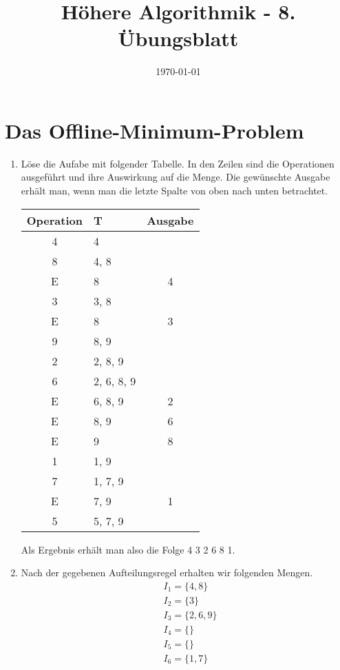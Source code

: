 \documentclass[a4paper,10pt]{article}
\title{H\"ohere Algorithmik - 8. \"Ubungsblatt}
\author{\Authors}
\date{\today}
\begin{document}
\maketitle

\section{Das Offline-Minimum-Problem}
\begin{enumerate}
\item  Löse die Aufabe mit folgender Tabelle. In den Zeilen sind die Operationen ausgeführt und ihre Auswirkung auf die Menge. Die gewünschte Ausgabe erhält man, wenn man die letzte Spalte von oben nach unten betrachtet.
    \begin{center}
	\begin{tabular}{ c | l | c }
	\textbf{Operation} & \textbf{T} & \textbf{Ausgabe} \\
	\hline
	4 & 4 & \\
	\hline
	8 & 4, 8 & \\
	\hline
	E & 8 & 4 \\
	\hline
	3 & 3, 8 & \\
	\hline
	E & 8 & 3 \\
	\hline
	9 & 8, 9 & \\
	\hline
	2 & 2, 8, 9 & \\
	\hline
	6 & 2, 6, 8, 9 & \\
	\hline
	E & 6, 8, 9 & 2 \\
	\hline
	E & 8, 9 & 6 \\
	\hline
	E & 9 & 8 \\
	\hline
	1 & 1, 9 & \\
	\hline
	7 & 1, 7, 9 & \\
	\hline
	E & 7, 9 & 1 \\
	\hline
	5 & 5, 7, 9 & \\
	\hline
	\end{tabular}
	\end{center}
	Als Ergebnis erhält man also die Folge 4 3 2 6 8 1.
\item   Nach der gegebenen Aufteilungsregel erhalten wir folgenden Mengen.\begin{align*}
	&I_1 = \{4, 8\}\\
	&I_2 = \{3\}\\
	&I_3 =\{2, 6, 9\}\\
	&I_4 = \{\} \\
	&I_5 = \{\}\\
	&I_6 = \{1, 7\}\\

\end{align*}
\end{enumerate}
\end{document}
